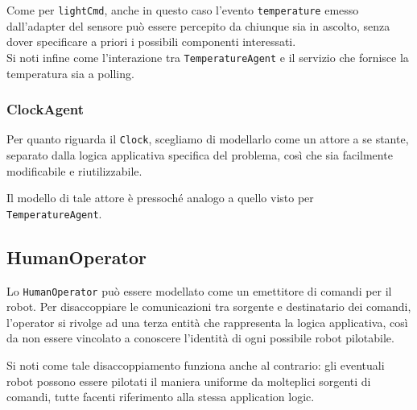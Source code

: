 \documentclass{../llncs}
\newcommand{\codescript}[1]{{\mbox{\small{\texttt{#1}}}}\xspace}
\newcommand{\labelssec}[1]{\label{ssec:#1}}
\newcommand{\xss}[1]{\subsectionname~\ref{ssec:#1}}
\newcommand{\subsectionname}{Subsection}
\begin{document}


Come per \codescript{lightCmd}, anche in questo caso l'evento \codescript{temperature}%
emesso dall'adapter del sensore può essere percepito da chiunque sia in ascolto, senza dover specificare a priori i possibili componenti interessati.\\

Si noti infine come l'interazione tra \codescript{TemperatureAgent} e il servizio che fornisce la temperatura sia a polling.

\subsubsection{ClockAgent}
Per quanto riguarda il \texttt{Clock}, scegliamo di modellarlo come un attore a se stante, separato dalla logica applicativa specifica del problema, così che sia facilmente modificabile e riutilizzabile.%

Il modello di tale attore è pressoché analogo a quello visto per \texttt{TemperatureAgent}.\\



\subsection{HumanOperator}
\labelssec{humanOpRA}
Lo \texttt{HumanOperator} può essere modellato come un emettitore di comandi per il robot. Per disaccoppiare le comunicazioni tra sorgente e destinatario dei comandi, l'operator si rivolge ad una terza entità che rappresenta la logica applicativa, così da non essere vincolato a conoscere l'identità di ogni possibile robot pilotabile.

Si noti come tale disaccoppiamento funziona anche al contrario: gli eventuali robot possono essere pilotati il maniera uniforme da molteplici sorgenti di comandi, tutte facenti riferimento alla stessa application logic.\\
\end{document}
